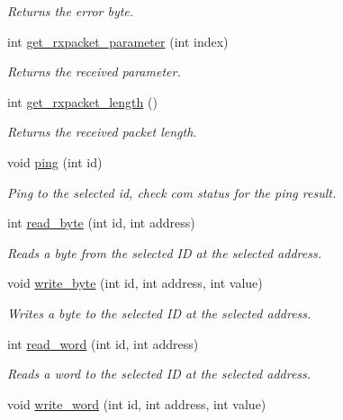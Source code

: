 \begin{DoxyCompactItemize}
\begin{DoxyCompactList}\small\item\em Returns the error byte. \end{DoxyCompactList}\item 
int \hyperlink{classdynamixel_a68b5fa99719a9aec0734ecfb0635503b}{get\+\_\+rxpacket\+\_\+parameter} (int index)
\begin{DoxyCompactList}\small\item\em Returns the received parameter. \end{DoxyCompactList}\item 
int \hyperlink{classdynamixel_ae9cc18fdeda8329f68fa0f2f0a7a9aba}{get\+\_\+rxpacket\+\_\+length} ()
\begin{DoxyCompactList}\small\item\em Returns the received packet length. \end{DoxyCompactList}\item 
void \hyperlink{classdynamixel_af2bd714423e7c4fc089762805c0c71f3}{ping} (int id)
\begin{DoxyCompactList}\small\item\em Ping to the selected id, check com status for the ping result. \end{DoxyCompactList}\item 
int \hyperlink{classdynamixel_a888404b41c4c4395a0b745c77ff2cea9}{read\+\_\+byte} (int id, int address)
\begin{DoxyCompactList}\small\item\em Reads a byte from the selected I\+D at the selected address. \end{DoxyCompactList}\item 
void \hyperlink{classdynamixel_a66c1e32cc45dd46d329f1fc212e46a3d}{write\+\_\+byte} (int id, int address, int value)
\begin{DoxyCompactList}\small\item\em Writes a byte to the selected I\+D at the selected address. \end{DoxyCompactList}\item 
int \hyperlink{classdynamixel_a45e99341e82c5114f6e829c9141bf96f}{read\+\_\+word} (int id, int address)
\begin{DoxyCompactList}\small\item\em Reads a word to the selected I\+D at the selected address. \end{DoxyCompactList}\item 
void \hyperlink{classdynamixel_a925f62ce5e261e5ef4fe6dc46bdc7c63}{write\+\_\+word} (int id, int address, int value)

\end{DoxyCompactItemize}
